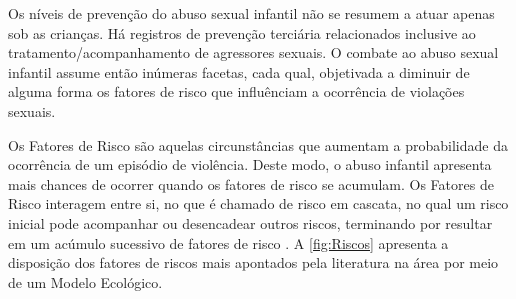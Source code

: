 Os níveis de prevenção do abuso sexual infantil não se resumem a atuar apenas sob as crianças. Há registros de prevenção terciária relacionados inclusive ao tratamento/acompanhamento de agressores sexuais. O combate ao abuso sexual infantil assume então inúmeras facetas, cada qual, objetivada a diminuir de alguma forma os fatores de risco que influênciam a ocorrência de violações sexuais.

Os Fatores de Risco são aquelas circunstâncias que aumentam a probabilidade da ocorrência de um episódio de violência. Deste modo, o abuso infantil apresenta mais chances de ocorrer quando os fatores de risco se acumulam. Os Fatores de Risco interagem entre si, no que é chamado de risco em cascata, no qual um risco inicial pode acompanhar ou desencadear outros riscos, terminando por resultar em um acúmulo sucessivo de fatores de risco \cite{Recommendations2019Taylor}. A \autoref{fig:Riscos} apresenta a disposição dos fatores de riscos mais apontados pela literatura na área por meio de um Modelo Ecológico. 









